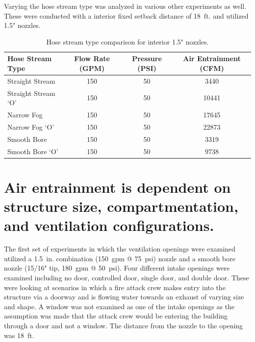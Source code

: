 \documentclass[12pt,oneside]{book}
\begin{document}
Varying the hose stream type was analyzed in various other experiments as well. These were conducted with a interior fixed setback distance of 18~ft. and utilized 1.5" nozzles.


\begin{table}[!ht]
\centering
\caption{Hose stream type comparison for interior 1.5" nozzles.}
\label{Hose_Stream_Type_Comparison}
\begin{tabular}{lccc}
\toprule[1.5pt]
Hose Stream Type & Flow Rate (GPM) & Pressure (PSI) & Air Entrainment (CFM) \\ 
\midrule
Straight Stream & 150 & 50 & 3440 \\
Straight Stream `O' & 150 & 50 & 10441 \\
Narrow Fog & 150 & 50 & 17645 \\
Narrow Fog `O' & 150 & 50 & 22873 \\
Smooth Bore & 150 & 50 & 3319 \\
Smooth Bore `O' & 150 & 50 & 9738 \\ 
\bottomrule[1.25pt]
\end{tabular}
\end{table}

\clearpage

\section{Air entrainment is dependent on structure size, compartmentation, and ventilation configurations.} 

The first set of experiments in which the ventilation openings were examined utilized a 1.5~in. combination (150~gpm @ 75~psi) nozzle and a smooth bore nozzle (15/16" tip, 180~gpm @ 50~psi). Four different intake openings were examined including no door, controlled door, single door, and double door. These were looking at scenarios in which a fire attack crew makes entry into the structure via a doorway and is flowing water towards an exhaust of varying size and shape. A window was not examined as one of the intake openings as the assumption was made that the attack crew would be entering the building through a door and not a window. The distance from the nozzle to the opening was 18~ft.
\end{document}
